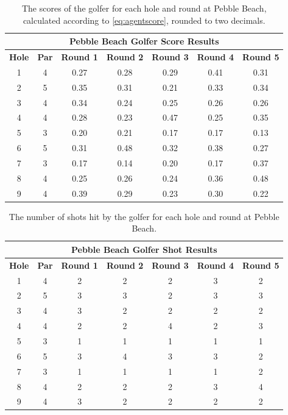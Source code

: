 \documentclass{kththesis}
\begin{document}
\begin{table}
    \centering
    \begin{tabular}{|c|c|c|c|c|c|c|} \hline
    \multicolumn{7}{|c|}{\textbf{Pebble Beach Golfer Score Results}} \\ \hline  
    \textbf{Hole} & \textbf{Par} & \textbf{Round 1} & \textbf{Round 2} & \textbf{Round 3} & \textbf{Round 4} & \textbf{Round 5} \\ \hline
    1 & 4 & 0.27 & 0.28 & 0.29 & 0.41 & 0.31 \\ \hline
    2 & 5 & 0.35 & 0.31 & 0.21 & 0.33 & 0.34 \\ \hline
    3 & 4 & 0.34 & 0.24 & 0.25 & 0.26 & 0.26 \\ \hline
    4 & 4 & 0.28 & 0.23 & 0.47 & 0.25 & 0.35 \\ \hline
    5 & 3 & 0.20 & 0.21 & 0.17 & 0.17 & 0.13 \\ \hline
    6 & 5 & 0.31 & 0.48 & 0.32 & 0.38 & 0.27 \\ \hline
    7 & 3 & 0.17 & 0.14 & 0.20 & 0.17 & 0.37 \\ \hline
    8 & 4 & 0.25 & 0.26 & 0.24 & 0.36 & 0.48 \\ \hline
    9 & 4 & 0.39 & 0.29 & 0.23 & 0.30 & 0.22 \\ \hline
    \end{tabular}
    \caption{The scores of the golfer for each hole and round at Pebble Beach, calculated according to \autoref{eq:agentscore}, rounded to two decimals.}
    \label{tab:L2_pebble_score_results}
\end{table}

\begin{table}
    \centering
    \begin{tabular}{|c|c|c|c|c|c|c|} \hline
    \multicolumn{7}{|c|}{\textbf{Pebble Beach Golfer Shot Results}} \\ \hline  
    \textbf{Hole} & \textbf{Par} & \textbf{Round 1} & \textbf{Round 2} & \textbf{Round 3} & \textbf{Round 4} & \textbf{Round 5} \\ \hline
    1 & 4 & 2 & 2 & 2 & 3 & 2 \\ \hline
    2 & 5 & 3 & 3 & 2 & 3 & 3 \\ \hline
    3 & 4 & 3 & 2 & 2 & 2 & 2 \\ \hline
    4 & 4 & 2 & 2 & 4 & 2 & 3 \\ \hline
    5 & 3 & 1 & 1 & 1 & 1 & 1 \\ \hline
    6 & 5 & 3 & 4 & 3 & 3 & 2 \\ \hline
    7 & 3 & 1 & 1 & 1 & 1 & 2 \\ \hline
    8 & 4 & 2 & 2 & 2 & 3 & 4 \\ \hline
    9 & 4 & 3 & 2 & 2 & 2 & 2 \\ \hline
    \end{tabular}
    \caption{The number of shots hit by the golfer for each hole and round at Pebble Beach.}
    \label{tab:L2_pebble_shot_results}
\end{table}
\end{document}
